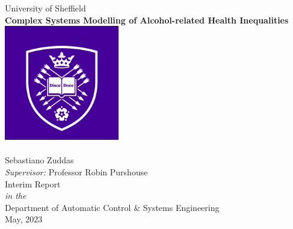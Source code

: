 \documentclass[11pt,oneside]{book}
\begin{document}

\frontmatter

\begin{titlepage}



\begin{center}
{\LARGE University of Sheffield}\\[1.5cm]
\linespread{1.2}\huge {\bfseries Complex Systems Modelling of Alcohol-related Health Inequalities}\\[1.5cm]
\linespread{1}
\includegraphics[width=5cm]{images/Circular UoS Logo.png}\\[1cm]
\\
{\Large Sebastiano Zuddas}\\[1cm]
{\large \emph{Supervisor:} Professor Robin Purshouse}\\[1cm] %
\large Interim Report\\[0.3cm] 
\textit{in the}\\[0.3cm]
Department of Automatic Control \& Systems Engineering\\[2cm]
May, 2023
\end{center}

\end{titlepage}


\mainmatter









 
 


\begin{appendices}

\end{appendices}
\end{document}
